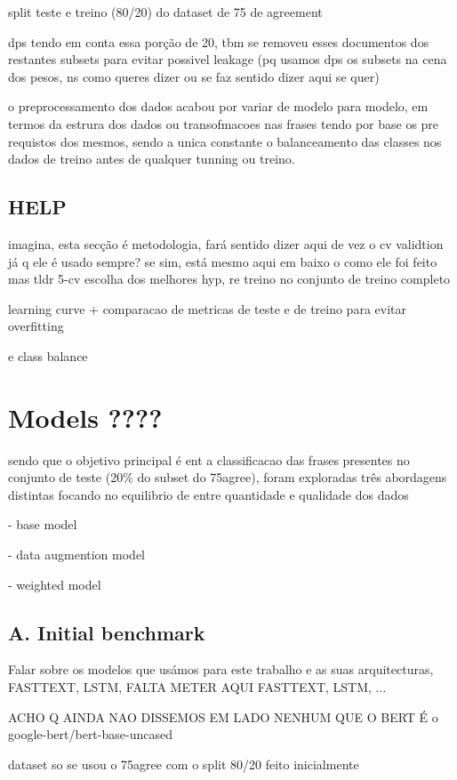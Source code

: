 \documentclass[conference]{IEEEtran}
\begin{document}
split teste e treino (80/20) do dataset de 75 de agreement

dps tendo em conta essa porção de 20, tbm se removeu esses documentos dos restantes subsets para evitar possivel leakage (pq usamos dps os subsets na cena dos pesos, ns como queres dizer ou se faz sentido dizer aqui se quer)

o preprocessamento dos dados acabou por variar de modelo para modelo, em termos da estrura dos dados ou transofmacoes nas frases tendo por base os pre requistos dos mesmos, sendo a unica constante o balanceamento das classes nos dados de treino antes de qualquer tunning ou treino.

\subsection{HELP}

imagina, esta secção é metodologia, fará sentido dizer aqui de vez o cv validtion já q ele é usado sempre? se sim, está mesmo aqui em baixo o como ele foi feito mas tldr 5-cv escolha dos melhores hyp, re treino no conjunto de treino completo

learning curve + comparacao de metricas de teste e de treino para evitar overfitting

e class balance

\section{Models ????}

sendo que o objetivo principal é ent a classificacao das frases presentes no conjunto de teste (20\% do subset do 75agree), foram exploradas três abordagens distintas focando no equilibrio de entre quantidade e qualidade dos dados

- base model

- data augmention model

- weighted model

\subsection{A. Initial benchmark}

Falar sobre os modelos que usámos para este trabalho e as suas arquitecturas, FASTTEXT, LSTM, 
FALTA METER AQUI FASTTEXT, LSTM, ...

ACHO Q AINDA NAO DISSEMOS EM LADO NENHUM QUE O BERT É o google-bert/bert-base-uncased

dataset so se usou o 75agree com o split 80/20 feito inicialmente
\end{document}

